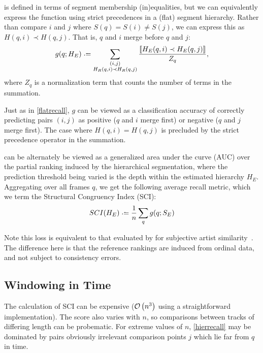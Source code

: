 \documentclass{article}
\begin{document}
 is defined in terms of segment membership (in)equalities, but 
we can equivalently express the function using strict precedences in a (flat)
segment hierarchy.
Rather than compare $i$ and $j$ where $S(q) = S(i) \neq S(j)$, we can express this as $H(q, i) \prec H(q, j)$.
That is, $q$ and $i$ merge before $q$ and $j$:
\begin{equation}
g(q ; H_E) \defeq \sum_{\substack{(i, j)\\ H_R(q, i) \prec H_R(q, j)}}
\frac{\ind{H_E(q, i) \prec H_E(q, j)}}{Z_q},\label{hierrecall}
\end{equation}
where $Z_q$ is a normalization term that counts the number of terms in the summation.

Just as in \cref{flatrecall}, $g$ can be viewed as a classification accuracy of
correctly predicting pairs $(i, j)$ as positive ($q$ and $i$ merge first) or negative
($q$ and $j$ merge first).  The case where $H(q, i) = H(q, j)$ is precluded by the
strict precedence operator in the summation.

 can be alternately be viewed as a generalized area under the curve
(AUC) over the partial ranking induced by the hierarchical segmentation, where the
prediction threshold being varied is the depth within the estimated hierarchy $H_E$.
Aggregating over all frames $q$, we get the following average recall metric, which we
term the Structural Congruency Index (SCI):
\begin{equation}
SCI(H_E) \defeq \frac{1}{n} \sum_q g(q ; S_E)
\end{equation}

Note this loss is equivalent to that evaluated by for subjective artist similarity~\cite{mcfee2011}.
The difference here is that the reference rankings are induced from ordinal data, and not subject to consistency errors.

\subsection{Windowing in Time}

The calculation of SCI can be expensive ($\mathcal{O}\left(n^3\right)$ using a straightforward 
implementation).
The score also varies with $n$, so comparisons between tracks of differing length can
be probematic.  For extreme values of $n$, \cref{hierrecall} may be dominated by pairs
obviously irrelevant comparison points $j$ which lie far from $q$ in time.
\end{document}
